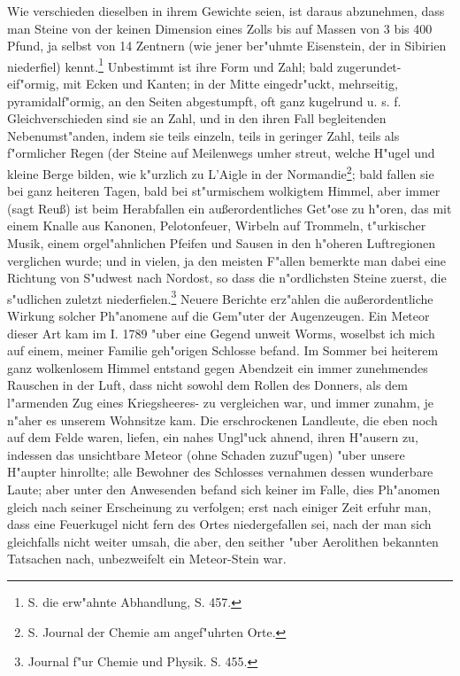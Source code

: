 \documentclass[a4paper, 11pt, oneside, polutonikogreek, german]{article}
\begin{document}
Wie verschieden dieselben in ihrem Gewichte seien, ist daraus abzunehmen, dass man Steine von der keinen Dimension eines Zolls bis auf Massen von 3 bis 400 Pfund, ja selbst von 14 Zentnern (wie jener ber"uhmte Eisenstein, der in Sibirien niederfiel) kennt.\footnote{S. die erw"ahnte Abhandlung, S. 457.} Unbestimmt ist ihre Form und Zahl; bald zugerundet-eif"ormig, mit Ecken und Kanten; in der Mitte eingedr"uckt, mehrseitig, pyramidalf"ormig, an den Seiten abgestumpft, oft ganz kugelrund u. s. f. Gleichverschieden sind sie an Zahl, und in den ihren Fall begleitenden Nebenumst"anden, indem sie teils einzeln, teils in geringer Zahl, teils als f"ormlicher Regen (der Steine auf Meilenwegs umher streut, welche H"ugel und kleine Berge bilden, wie k"urzlich zu L’Aigle in der Normandie\footnote{S. Journal der Chemie am angef"uhrten Orte.}; bald fallen sie bei ganz heiteren Tagen, bald bei st"urmischem wolkigtem Himmel, aber immer (sagt Reuß) ist beim Herabfallen ein außerordentliches Get"ose zu h"oren, das mit einem Knalle aus Kanonen, Pelotonfeuer, Wirbeln auf Trommeln, t"urkischer Musik, einem orgel"ahnlichen Pfeifen und Sausen in den h"oheren Luftregionen verglichen wurde; und in vielen, ja den meisten F"allen bemerkte man dabei eine Richtung von S"udwest nach Nordost, so dass die n"ordlichsten Steine zuerst, die s"udlichen zuletzt niederfielen.\footnote{Journal f"ur Chemie und Physik. S. 455.} Neuere Berichte erz"ahlen die außerordentliche Wirkung solcher Ph"anomene auf die Gem"uter der Augenzeugen. Ein Meteor dieser Art kam im I. 1789 "uber eine Gegend unweit Worms, woselbst ich mich auf einem, meiner Familie geh"origen Schlosse befand. Im Sommer bei heiterem ganz wolkenlosem Himmel entstand gegen Abendzeit ein immer zunehmendes Rauschen in der Luft, dass nicht sowohl dem Rollen des Donners, als dem l"armenden Zug eines Kriegsheeres- zu vergleichen war, und immer zunahm, je n"aher es unserem Wohnsitze kam. Die erschrockenen Landleute, die eben noch auf dem Felde waren, liefen, ein nahes Ungl"uck ahnend, ihren H"ausern zu, indessen das unsichtbare Meteor (ohne Schaden zuzuf"ugen) "uber unsere H"aupter hinrollte; alle Bewohner des Schlosses vernahmen dessen wunderbare Laute; aber unter den Anwesenden befand sich keiner im Falle, dies Ph"anomen gleich nach seiner Erscheinung zu verfolgen; erst nach einiger Zeit erfuhr man, dass eine Feuerkugel nicht fern des Ortes niedergefallen sei, nach der man sich gleichfalls nicht weiter umsah, die aber, den seither "uber Aerolithen bekannten Tatsachen nach, unbezweifelt ein Meteor-Stein war.
\end{document}
